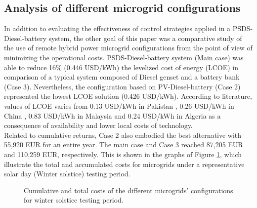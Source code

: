 \documentclass{ECOS_2019}
\begin{document}
\subsection{Analysis of different microgrid configurations}
In addition to evaluating the effectiveness of control strategies applied in a PSDS-Diesel-battery system, the other goal of this paper was a comparative study of the use of remote hybrid power microgrid configurations from the point of view of minimizing the operational costs.
PSDS-Diesel-battery system (Main case) was able to reduce 16\% (0.446 USD/kWh) the levelized cost of energy (LCOE) in comparison of a typical system composed of Diesel genset and a battery bank (Case 3). Nevertheless, the configuration based on PV-Diesel-battery (Case 2) represented the lowest LCOE solution (0.426 USD/kWh). According to literature, values of LCOE varies from 0.13 USD/kWh in Pakistan \cite{Lashari2021}, 0.26 USD/kWh in China \cite{Zayed2020}, 0.83 USD/kWh in Malaysia \cite{Bataineh2017} and 0.24 USD/kWh in Algeria \cite{Abbas2011} as a consequence of availability and lower local costs of technology.\\
Related to cumulative returns, Case 2 also embodied the best alternative with 55,920 EUR for an entire year. The main case and Case 3 reached 87,205 EUR and 110,259 EUR, respectively. This is shown in the graphs of Figure \ref{fig_microgrids}, which illustrate the total and accumulated costs for microgrids under a representative solar day (Winter solstice) testing period.
\begin{figure}[h!]
    \centering
    \caption{Cumulative and total costs of the different microgrids’ configurations for winter solstice testing period.}
    \label{fig_microgrids}
\end{figure}
\end{document}
